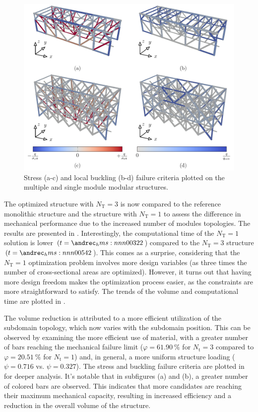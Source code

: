 \begin{figure}
    \centering
    \includegraphics[width=\linewidth]{figures/05_cellular_opt/00_multiple_failure/mul_mech.pdf}
    \caption{Stress (a-c) and local buckling (b-d) failure criteria plotted on the multiple and single module modular structures.}
    \label{fig:05_multiple_topology_sol_mech}
\end{figure}

The optimized structure with $N_\text{T}=3$ is now compared to the reference monolithic structure and the structure with $N_\text{T}=1$ to assess the difference in mechanical performance due to the increased number of modules topologies. The results are presented in . Interestingly, the computational time of the $N_\text{T}=1$ solution is lower $(t = \hms{00;3;22}$) compared to the $N_\text{T}=3$ structure $(t = \hms{00;5;42}$). This comes as a surprise, considering that the $N_\text{T}=1$ optimization problem involves more design variables (as three times the number of cross-sectional areas are optimized). However, it turns out that having more design freedom makes the optimization process easier, as the constraints are more straightforward to satisfy. The trends of the volume and computational time are plotted in .

The volume reduction is attributed to a more efficient utilization of the subdomain topology, which now varies with the subdomain position. This can be observed by examining the more efficient use of material, with a greater number of bars reaching the mechanical failure limit ($\varphi = \qty{61.90}{\%}$ for $N_\text{t} = 3$ compared to $\varphi = \qty{20.51}{\%}$ for $N_\text{t} = 1$) and, in general, a more uniform structure loading ($\psi = 0.716$ vs. $\psi = 0.327$). The stress and buckling failure criteria are plotted in  for deeper analysis. It's notable that in subfigures (a) and (b), a greater number of colored bars are observed. This indicates that more candidates are reaching their maximum mechanical capacity, resulting in increased efficiency and a reduction in the overall volume of the structure.

